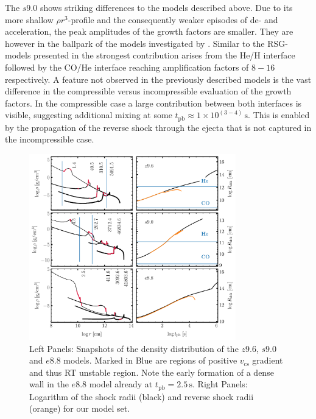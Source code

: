 \documentclass[fleqn,usenatbib]{mnras}
\begin{document}
The $s9.0$ shows striking differences to the models described above. 
Due to its more shallow $\rho r^3$-profile and the consequently weaker episodes of de- and acceleration, the peak amplitudes of the growth factors are smaller. They are however in the ballpark of the models investigated by \cite{Wongwathanarat2015}. 
Similar to the RSG-models presented in \citet{Wongwathanarat2015} the strongest contribution arises from the He/H interface followed by the CO/He interface reaching amplification factors of $8-16$ respectively. 
A feature not observed in the previously described models is the vast difference in the compressible versus incompressible evaluation of the growth factors. In the compressible case a large contribution between both interfaces is visible, suggesting additional mixing at some $t_{\mathrm{pb}}\approx 1\times 10^{(3-4)}\,\text{s}$. This is enabled by the propagation of the reverse shock through the ejecta that is not captured in the incompressible case. 

\begin{figure}
 \centering
 \includegraphics[width=0.8\textwidth]{pic/density_times_all.pdf}
 \caption{Left Panels: Snapshots of the density distribution of the $z9.6$, $s9.0$ and $e8.8$ models. Marked in Blue are regions of positive $v_{\mathrm{cs}}$ gradient and thus RT unstable region. Note the early formation of a dense wall in the $e8.8$ model already at $t_{\mathrm{pb}}=2.5\,\text{s}$. Right Panels: Logarithm of the shock radii (black) and reverse shock radii (orange) for our model set. }
 \label{fig:density all times}
\end{figure}
\end{document}
